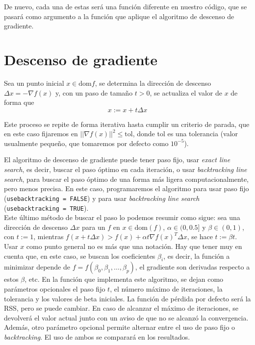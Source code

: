 \documentclass[11pt]{opticajnl}
\begin{document}
De nuevo, cada una de estas será una función diferente en nuestro código, que se pasará como argumento a la función que aplique el algoritmo de descenso de gradiente. 


\section{Descenso de gradiente}

Sea un punto inicial $x \in \text{dom}f$, se determina la dirección de descenso $\Delta x = -\nabla f(x)$ y, con un paso de tamaño $t > 0$, se actualiza el valor de $x$ de forma que 
\begin{equation}
x := x + t\Delta x
\end{equation}

Este proceso se repite de forma iterativa hasta cumplir un criterio de parada, que en este caso fijaremos en $||\nabla f(x)||^2 \leq \text{tol}$, donde tol es una tolerancia (valor usualmente pequeño, que tomaremos por defecto como $10^{-5}$). 

El algoritmo de descenso de gradiente puede tener paso fijo, usar \textit{exact line search}, es decir, buscar el paso óptimo en cada iteración, o usar \textit{backtracking line search}, para buscar el paso óptimo de una forma más ligera computacionalmente, pero menos precisa. En este caso, programaremos el algoritmo para usar paso fijo (\texttt{usebacktracking = FALSE}) y para usar \textit{backtracking line search} (\texttt{usebacktracking = TRUE}). \\

Este último método de buscar el paso lo podemos resumir como sigue: sea una dirección de descenso $\Delta x$ para un $f$ en $x \in \text{dom}(f)$, $\alpha \in (0, 0.5]$ y $\beta \in (0, 1)$, con $t:= 1$, mientras $f(x + t\Delta x) > f(x) + \alpha t \nabla f(x)^T\Delta x$, se hace $t := \beta t$. \\

Usar $x$ como punto general no es más que una notación. Hay que tener muy en cuenta que, en este caso, se buscan los coeficientes $\beta_i$, es decir, la función a minimizar depende de $f = f(\beta_0, \beta_1, \dots, \beta_p)$, el gradiente son derivadas respecto a estos $\beta$, etc. En la función que implementa este algoritmo, se dejan como parámetros opcionales el paso fijo $t$, el número máximo de iteraciones, la tolerancia y los valores de beta iniciales. La función de pérdida por defecto será la RSS, pero se puede cambiar. En caso de alcanzar el máximo de iteraciones, se devolverá el valor actual junto con un aviso de que no se alcanzó la convergencia. Además, otro parámetro opcional permite alternar entre el uso de paso fijo o \textit{backtracking}. El uso de ambos se comparará en los resultados. \\
\end{document}
